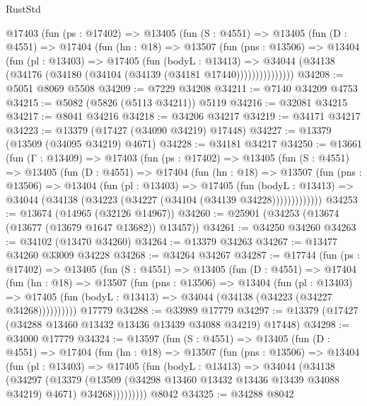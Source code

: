 \begin{lexlean}{RustStd}
\begin{coremodule}
      @17403
        (fun (ps : @17402) =>
        @13405
          (fun (S : @4551) =>
          @13405
            (fun (D : @4551) =>
            @17404
              (fun (hn : @18) =>
              @13507
                (fun (pns : @13506) =>
                @13404
                  (fun (pl : @13403) =>
                  @17405
                    (fun (bodyL : @13413) =>
                    @34044 (@34138 (@34176 (@34180 (@34104 (@34139 (@34181 @17440)))))))))))))))
@34208 := @5051 @8069 @5508
@34209 := @7229 @34208
@34211 := @7140 @34209 @4753
@34215 := @5082 (@5826 (@5113 @34211)) @5119
@34216 := @32081 @34215
@34217 := @8041 @34216
@34218 := @34206 @34217
@34219 := @34171 @34217
@34223 := @13379 (@17427 (@34090 @34219) @17448)
@34227 := @13379 (@13509 (@34095 @34219) @4671)
@34228 := @34181 @34217
@34250 := @13661
    (fun (Γ : @13409) =>
    @17403
      (fun (ps : @17402) =>
      @13405
        (fun (S : @4551) =>
        @13405
          (fun (D : @4551) =>
          @17404
            (fun (hn : @18) =>
            @13507
              (fun (pns : @13506) =>
              @13404
                (fun (pl : @13403) =>
                @17405
                  (fun (bodyL : @13413) =>
                  @34044 (@34138 (@34223 (@34227 (@34104 (@34139 @34228)))))))))))))
@34253 := @13674 (@14965 (@32126 @14967))
@34260 := @25901 (@34253 (@13674 (@13677 (@13679 @1647 @13682)) @13457))
@34261 := @34250 @34260
@34263 := @34102 (@13470 @34260)
@34264 := @13379 @34263
@34267 := @13477 @34260 @33009 @34228
@34268 := @34264 @34267
@34287 := @17744
    (fun (ps : @17402) =>
    @13405
      (fun (S : @4551) =>
      @13405
        (fun (D : @4551) =>
        @17404
          (fun (hn : @18) =>
          @13507
            (fun (pns : @13506) =>
            @13404
              (fun (pl : @13403) =>
              @17405 (fun (bodyL : @13413) => @34044 (@34138 (@34223 (@34227 @34268))))))))))
    @17779
@34288 := @33989 @17779
@34297 := @13379 (@17427 (@34288 @13460 @13432 @13436 @13439 @34088 @34219) @17448)
@34298 := @34000 @17779
@34324 := @13597
    (fun (S : @4551) =>
    @13405
      (fun (D : @4551) =>
      @17404
        (fun (hn : @18) =>
        @13507
          (fun (pns : @13506) =>
          @13404
            (fun (pl : @13403) =>
            @17405
              (fun (bodyL : @13413) =>
              @34044
                (@34138
                  (@34297
                    (@13379
                      (@13509 (@34298 @13460 @13432 @13436 @13439 @34088 @34219) @4671)
                      @34268)))))))))
    @8042
@34325 := @34288 @8042

\end{coremodule}
\end{lexlean}
